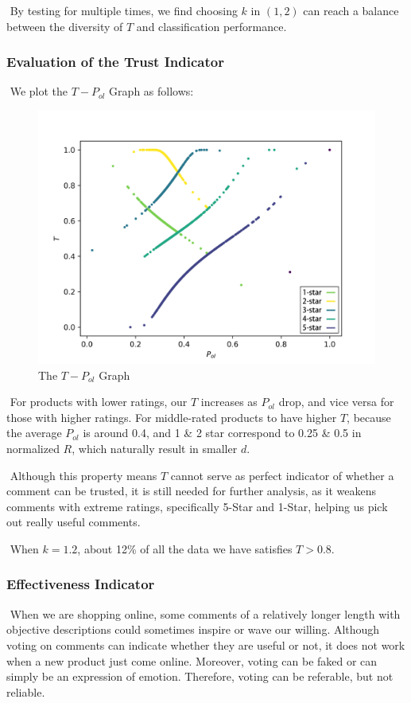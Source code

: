 \documentclass[12pt]{article}  %
\begin{document}
​		By testing for multiple times, we find choosing $k$ in $(1,2)$ can reach a balance between the diversity of $T$ and classification performance.

\subsubsection{Evaluation of the Trust Indicator}


​		We plot the $T - P_{ol}$ Graph as follows:
\begin{figure}[H]
  \centering
  \includegraphics[width=0.7\linewidth]{Q1picture/T-pol.jpg}
  \caption{The $T - P_{ol}$ Graph}
  \label{fig:}
\end{figure}


​		For products with lower ratings, our $T$ increases as  $P_{ol}$ drop, and vice versa for those with higher ratings. For middle-rated products to have higher $T$, because the average $P_{ol}$ is around 0.4, and 1 \& 2 star correspond to 0.25 \& 0.5 in normalized $R$, which naturally result in smaller $d$. 

​		Although this property means $T$ cannot serve as perfect indicator of whether a comment can be trusted, it is still needed for further analysis, as it weakens comments with extreme ratings, specifically 5-Star and 1-Star, helping us pick out really useful comments.

​		When $k = 1.2$, about 12\% of all the data we have satisfies $T > 0.8$.

\subsubsection{Effectiveness Indicator}




​		When we are shopping online, some comments of a relatively longer length with objective descriptions could sometimes inspire or wave our willing. Although voting on comments can indicate whether they are useful or not, it does not work when a new product just come online. Moreover, voting can be faked or can simply be an expression of emotion. Therefore, voting can be referable, but not reliable.
\end{document}

